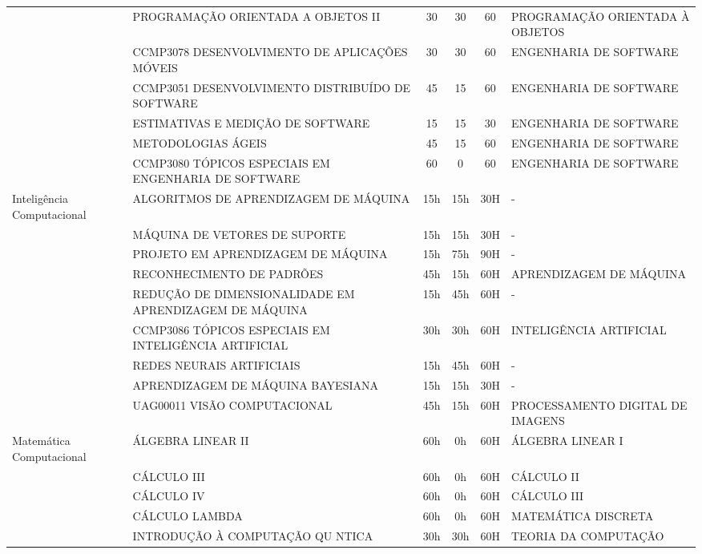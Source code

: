 \begin{center}
\begin{tiny}
\begin{longtable}{p{2.5cm}p{5.5cm}cccp{3.3cm}}
    & PROGRAMAÇÃO ORIENTADA A OBJETOS II & 30 & 30 & 60 & PROGRAMAÇÃO ORIENTADA À OBJETOS \\ \cline{2-6}
    & CCMP3078 DESENVOLVIMENTO DE APLICAÇÕES MÓVEIS & 30 & 30 & 60 & ENGENHARIA DE SOFTWARE \\ \cline{2-6}
    & CCMP3051 DESENVOLVIMENTO DISTRIBUÍDO DE SOFTWARE & 45 & 15 & 60 & ENGENHARIA DE SOFTWARE \\ \cline{2-6}
    & ESTIMATIVAS E MEDIÇÃO DE SOFTWARE & 15 & 15 & 30 & ENGENHARIA DE SOFTWARE \\ \cline{2-6}
    & METODOLOGIAS ÁGEIS & 45 & 15 & 60 & ENGENHARIA DE SOFTWARE \\ \cline{2-6}
    & CCMP3080 TÓPICOS ESPECIAIS EM ENGENHARIA DE SOFTWARE & 60 & 0 & 60 & ENGENHARIA DE SOFTWARE \\ \midrule
  Inteligência Computacional & ALGORITMOS DE APRENDIZAGEM DE MÁQUINA & 15h & 15h & 30H & - \\ \cline{2-6}
    & MÁQUINA DE VETORES DE SUPORTE & 15h & 15h & 30H & - \\ \cline{2-6}
    & PROJETO EM APRENDIZAGEM DE MÁQUINA & 15h & 75h & 90H & - \\ \cline{2-6}
    & RECONHECIMENTO DE PADRÕES & 45h & 15h & 60H & APRENDIZAGEM DE MÁQUINA \\ \cline{2-6}
    & REDUÇÃO DE DIMENSIONALIDADE EM APRENDIZAGEM DE MÁQUINA & 15h & 45h & 60H & - \\ \cline{2-6}
    & CCMP3086 TÓPICOS ESPECIAIS EM INTELIGÊNCIA ARTIFICIAL & 30h & 30h & 60H & INTELIGÊNCIA ARTIFICIAL \\ \cline{2-6}
    & REDES NEURAIS ARTIFICIAIS & 15h & 45h & 60H & - \\ \cline{2-6}
    & APRENDIZAGEM DE MÁQUINA BAYESIANA & 15h & 15h & 30H & - \\ \cline{2-6}
    & UAG00011 VISÃO COMPUTACIONAL & 45h & 15h & 60H & PROCESSAMENTO DIGITAL DE IMAGENS \\ \midrule
  Matemática Computacional & ÁLGEBRA LINEAR II & 60h & 0h & 60H & ÁLGEBRA LINEAR I \\ \cline{2-6}
    & CÁLCULO III & 60h & 0h & 60H & CÁLCULO II \\ \cline{2-6}
    & CÁLCULO IV & 60h & 0h & 60H & CÁLCULO III \\ \cline{2-6}
    & CÁLCULO LAMBDA & 60h & 0h & 60H & MATEMÁTICA DISCRETA \\ \cline{2-6}
    & INTRODUÇÃO À COMPUTAÇÃO QU NTICA & 30h & 30h & 60H & TEORIA DA COMPUTAÇÃO \\ \cline{2-6}

\end{longtable}
\end{tiny}
\end{center}
